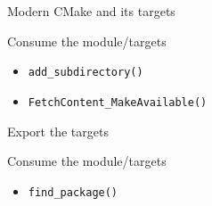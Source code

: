 \documentclass{beamer}
\begin{document}
\begin{frame}[fragile]{Modern CMake and its targets}%
	\vspace{1cm}
	
	
	\begin{block}{\small Consume the module/targets}
		\begin{itemize}\small%
			\item \texttt{add\_subdirectory()}%
			\item \texttt{FetchContent\_MakeAvailable()}%
		\end{itemize}
	\end{block}
\end{frame}

\begin{frame}[fragile]{Export the targets}%
	\vspace{1cm}
	\begin{block}{\small Consume the module/targets}
		\begin{itemize}\small%
			\item \texttt{find\_package()}%
		\end{itemize}
	\end{block}
\end{frame}
\end{document}
